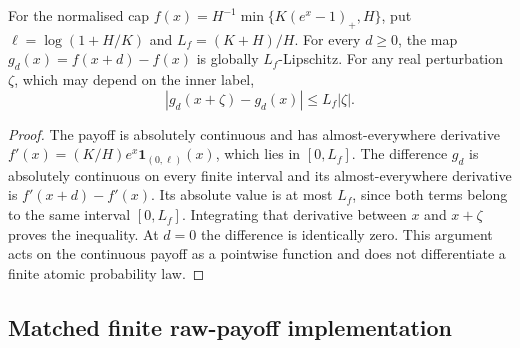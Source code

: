 \begin{lemma}
\label{lem:common-information-inner-payoff}
For the normalised cap
$f(x)=H^{-1}\min\{K(e^x-1)_+,H\}$, put
$\ell=\log(1+H/K)$ and $L_f=(K+H)/H$. For every $d\geq0$, the map
$g_d(x)=f(x+d)-f(x)$ is globally $L_f$-Lipschitz. For any real
perturbation $\zeta$, which may depend on the inner label,
\begin{equation}
 |g_d(x+\zeta)-g_d(x)|\leq L_f|\zeta|.
 \label{eq:common-information-inner-payoff}
\end{equation}
\end{lemma}
\begin{proof}
The payoff is absolutely continuous and has almost-everywhere derivative
$f'(x)=(K/H)e^x\mathbf1_{(0,\ell)}(x)$, which lies in $[0,L_f]$.
The difference $g_d$ is absolutely continuous on every finite interval
and its almost-everywhere derivative is $f'(x+d)-f'(x)$.
Its absolute value is at most $L_f$, since both terms belong to the same
interval $[0,L_f]$. Integrating that derivative between $x$ and $x+\zeta$
proves the inequality. At $d=0$ the difference is identically zero.
This argument acts on the continuous payoff as a pointwise function and
does not differentiate a finite atomic probability law.
\end{proof}

\subsection{Matched finite raw-payoff implementation}

